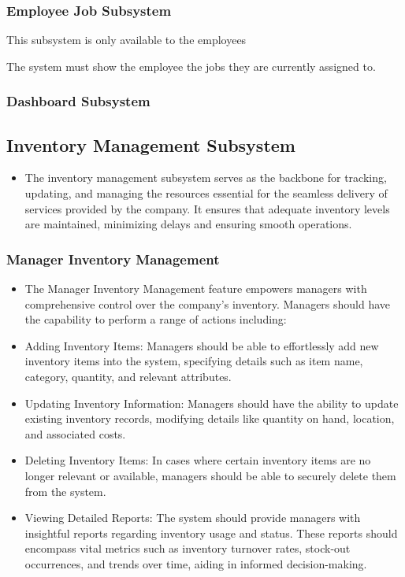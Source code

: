 \documentclass{article}
\begin{document}
	\subsubsection*{Employee Job Subsystem}	
	\begin{list}{R.}{}
		\item This subsystem is only available to the employees
		\item The system must show the employee the jobs they are currently assigned to. 
	\end{list}
	
	\subsubsection*{Dashboard Subsystem}	
	
	\subsection*{Inventory Management Subsystem}
	\begin{itemize}
	    \item The inventory management subsystem serves as the backbone for tracking, updating, and managing the resources essential for the seamless delivery of services provided by the company. It ensures that adequate inventory levels are maintained, minimizing delays and ensuring smooth operations.
	\end{itemize}
	\subsubsection*{Manager Inventory Management}	
	\begin{itemize}
	    \item The Manager Inventory Management feature empowers managers with comprehensive control over the company's inventory. Managers should have the capability to perform a range of actions including:
	    \item Adding Inventory Items: Managers should be able to effortlessly add new inventory items into the system, specifying details such as item name, category, quantity, and relevant attributes.
	    \item Updating Inventory Information: Managers should have the ability to update existing inventory records, modifying details like quantity on hand, location, and associated costs.
	    \item Deleting Inventory Items: In cases where certain inventory items are no longer relevant or available, managers should be able to securely delete them from the system.
	    \item Viewing Detailed Reports: The system should provide managers with insightful reports regarding inventory usage and status. These reports should encompass vital metrics such as inventory turnover rates, stock-out occurrences, and trends over time, aiding in informed decision-making.
	\end{itemize}
\end{document}
